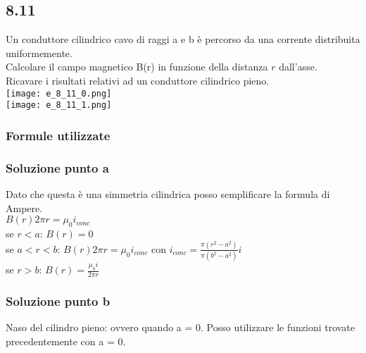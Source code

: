 \documentclass[../../main.tex]{subfiles}
\begin{document}
\subsection*{8.11}
Un conduttore cilindrico cavo di raggi a e b è percorso da una corrente distribuita uniformemente.\\
Calcolare il campo magnetico B(r) in funzione della distanza $r$ dall'asse.\\
Ricavare i risultati relativi ad un conduttore cilindrico pieno.\\
\texttt{[image: e\_8\_11\_0.png]}\\
\texttt{[image: e\_8\_11\_1.png]}
\subsubsection*{Formule utilizzate}
\subsubsection*{Soluzione punto a}
Dato che questa è una simmetria cilindrica posso semplificare la formula di Ampere.\\
$B(r) 2\pi r = \mu_0 i_{conc}$\\
se $r < a$: $B(r) = 0$\\
se $a < r < b$: $B(r) 2\pi r = \mu_0 i_{conc}$ con $i_{conc} = \frac{\pi \left(r^2 - a^2\right)}{\pi\left(b^2-a^2\right)}i$\\
se $r > b$: $B(r) = \frac{\mu_0 i}{2\pi r}$
\subsubsection*{Soluzione punto b}
Naso del cilindro pieno: ovvero quando a = 0. Posso utilizzare le funzioni trovate precedentemente con a = 0.
\newpage
\end{document}
